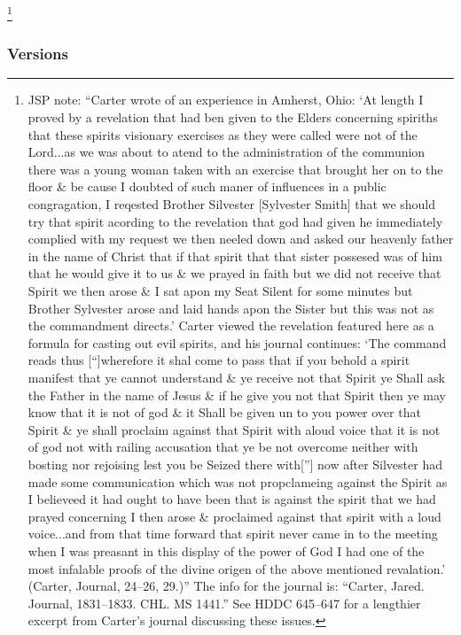 				\footnote{%
					JSP note: ``Carter wrote of an experience in Amherst, Ohio: `At length I proved by a revelation that had ben given to the Elders concerning spiriths that these spirits visionary exercises as they were called were not of the Lord...as we was about to atend to the administration of the communion there was a young woman taken with an exercise that brought her on to the floor \& be cause I doubted of such maner of influences in a public congragation, I reqested Brother Silvester [Sylvester Smith] that we should try that spirit acording to the revelation that god had given he immediately complied with my request we then neeled down and asked our heavenly father in the name of Christ that if that spirit that that sister possesed was of him that he would give it to us \& we prayed in faith but we did not receive that Spirit we then arose \& I sat apon my Seat Silent for some minutes but Brother Sylvester arose and laid hands apon the Sister but this was not as the commandment directs.' Carter viewed the revelation featured here as a formula for casting out evil spirits, and his journal continues: `The command reads thus [``]wherefore it shal come to pass that if you behold a spirit manifest that ye cannot understand \& ye receive not that Spirit ye Shall ask the Father in the name of Jesus \& if he give you not that Spirit then ye may know that it is not of god \& it Shall be given un to you power over that Spirit \& ye shall proclaim against that Spirit with aloud voice that it is not of god not with railing accusation that ye be not overcome neither with bosting nor rejoising lest you be Seized there with[''] now after Silvester had made some communication which was not propclameing against the Spirit as I believeed it had ought to have been that is against the spirit that we had prayed concerning I then arose \& proclaimed against that spirit with a loud voice...and from that time forward that spirit never came in to the meeting when I was preasant in this display of the power of God I had one of the most infalable proofs of the divine origen of the above mentioned revalation.' (Carter, Journal, 24--26, 29.)'' The info for the journal is: ``Carter, Jared. Journal, 1831--1833. CHL. MS 1441.'' See HDDC 645--647 for a lengthier excerpt from Carter's journal discussing these issues.
					}
		
	\subsubsection{Versions}
		\label{DC50-V}
		
